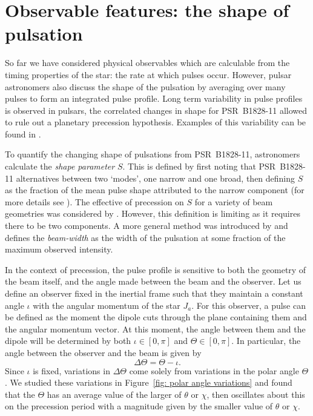 \documentclass[../full_thesis/full_thesis.tex]{subfiles}
\begin{document}
\section{Observable features: the shape of pulsation}
\label{sec: observable features: shape}

So far we have considered physical observables which are calculable from the
timing properties of the star: the rate at which pulses occur. However, pulsar
astronomers also discuss the shape of the pulsation by averaging over many
pulses to form an integrated pulse profile.  Long term variability in pulse
profiles is observed in pulsars, the correlated changes in shape for
PSR~B1828-11 allowed \citet{Stairs2000} to rule out a planetary precession
hypothesis. Examples of this variability can be found in \citet{Lyne2010}.

To quantify the changing shape of pulsations from PSR~B1828-11, astronomers
calculate the \emph{shape parameter} $S$. This is defined by first noting that
PSR~B1828-11 alternatives between two `modes', one narrow and one broad, then
defining $S$ as the fraction of the mean pulse shape attributed to the narrow
component (for more details see \citet{Stairs2003}). The effective of precession
on $S$ for a variety of beam geometries was considered by \citet{Akgun2006}.
However, this definition is limiting as it requires there to be two components.
A more general method was introduced by \citet{Lyne2010} and defines the
\emph{beam-width} as the width of the pulsation at some fraction of the maximum
observed intensity.

In the context of precession, the pulse profile is sensitive to both the
geometry of the beam itself, and the angle made between the beam and the
observer.  Let us define an observer fixed in the inertial frame such that they
maintain a constant angle $\iota$ with the angular momentum of the star $J_a$.
For this observer, a pulse can be defined as the moment the dipole cuts through
the plane containing them and the angular momentum vector. At this moment, the
angle between them and the dipole will be determined by both $\iota \in [0, \pi]$ and
$\Theta \in [0, \pi]$. In particular, the angle between the observer and the beam
is given by
\begin{equation}
\Delta\Theta = \Theta - \iota.
\label{eqn: delta Theta}
\end{equation}
Since $\iota$ is fixed, variations in $\Delta\Theta$ come solely from
variations in the polar angle $\Theta$. We studied these variations in
Figure~\ref{fig: polar angle variations} and found that the $\Theta$ has an
average value of the larger of $\theta$ or $\chi$, then oscillates about this
on the precession period with a magnitude given by the smaller value of
$\theta$ or $\chi$.
\end{document}
